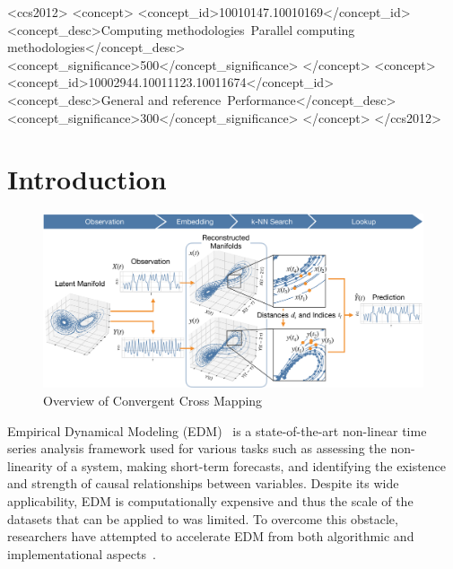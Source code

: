\documentclass[sigconf]{acmart}
\begin{document}

\begin{CCSXML}
<ccs2012>
   <concept>
       <concept_id>10010147.10010169</concept_id>
       <concept_desc>Computing methodologies~Parallel computing methodologies</concept_desc>
       <concept_significance>500</concept_significance>
       </concept>
   <concept>
       <concept_id>10002944.10011123.10011674</concept_id>
       <concept_desc>General and reference~Performance</concept_desc>
       <concept_significance>300</concept_significance>
       </concept>
 </ccs2012>
\end{CCSXML}


\maketitle

\section{Introduction}

\begin{figure}
    \centering
    \includegraphics[width=1.0\linewidth]{figs/xmap_overview}
    \caption{Overview of Convergent Cross Mapping}%
    \label{fig:edm}
\end{figure}

Empirical Dynamical Modeling (EDM)~\cite{Chang2017} is a state-of-the-art
non-linear time series analysis framework used for various tasks such as
assessing the non-linearity of a system, making short-term forecasts, and
identifying the existence and strength of causal relationships between
variables. Despite its wide applicability, EDM is computationally expensive
and thus the scale of the datasets that can be applied to was limited. To
overcome this obstacle, researchers have attempted to accelerate EDM  from
both algorithmic and implementational aspects~\cite{Pu2019,Ma2014}.
\end{document}
